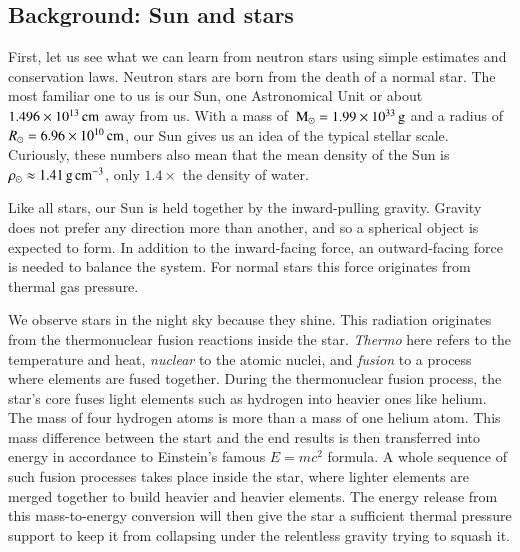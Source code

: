 \subsection{Background: Sun and stars}
First, let us see what we can learn from neutron stars using simple estimates and conservation laws.
Neutron stars are born from the death of a normal star.  %
The most familiar one to us is our Sun, one Astronomical Unit or about $1.496 \times 10^{13} \, \mathrm{cm}$ away from us.%
With a mass of $\, \mathrm{M}_{\odot} = 1.99 \times 10^{33} \, \mathrm{g}$ and a radius of $R_{\odot} = 6.96 \times 10^{10} \, \mathrm{cm}$, our Sun gives us an idea of the typical stellar scale.
Curiously, these numbers also mean that the mean density of the Sun is $\rho_{\odot} \approx 1.41 \, \mathrm{g}\,\mathrm{cm}^{-3}$, only $1.4\times$ the density of water.

Like all stars, our Sun is held together by the inward-pulling gravity.
Gravity does not prefer any direction more than another, and so a spherical object is expected to form.
In addition to the inward-facing force, an outward-facing force is needed to balance the system.
For normal stars this force originates from thermal gas pressure.

We observe stars in the night sky because they shine.
This radiation originates from the thermonuclear fusion reactions inside the star.
\emph{Thermo} here refers to the temperature and heat, \emph{nuclear} to the atomic nuclei, and \emph{fusion} to a process where elements are fused together.
During the thermonuclear fusion process, the star's core fuses light elements such as hydrogen into heavier ones like helium.
The mass of four hydrogen atoms is more than a mass of one helium atom.
This mass difference between the start and the end results is then transferred into energy in accordance to Einstein's famous $E = mc^2$ formula.
A whole sequence of such fusion processes takes place inside the star, where lighter elements are merged together to build heavier and heavier elements.
The energy release from this mass-to-energy conversion will then give the star a sufficient thermal pressure support to keep it from collapsing under the relentless gravity trying to squash it.

